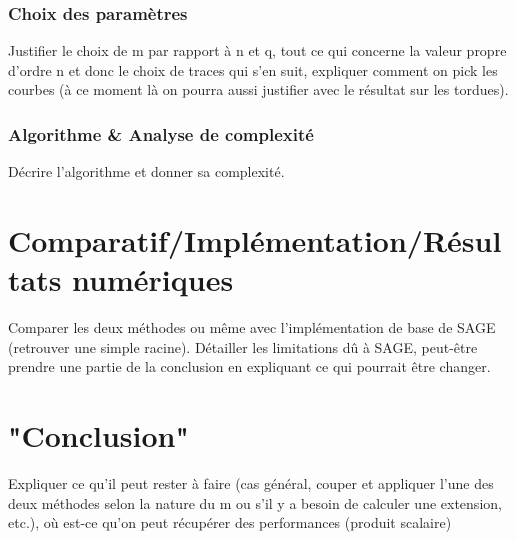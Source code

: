 \documentclass[a4paper]{article} %
\numberwithin{equation}{section}
\begin{document}
\subsubsection{Choix des paramètres}
Justifier le choix de m par rapport à n et q, tout ce qui concerne la valeur 
propre d'ordre n et donc le choix de traces qui s'en suit, expliquer comment on
pick les courbes (à ce moment là on pourra aussi justifier avec le résultat 
sur les tordues).
\subsubsection{Algorithme \& Analyse de complexité}
Décrire l'algorithme et donner sa complexité.

\section{Comparatif/Implémentation/Résultats numériques}
Comparer les deux méthodes ou même avec l'implémentation de base de SAGE 
(retrouver une simple racine). Détailler les limitations dû à SAGE, peut-être
prendre une partie de la conclusion en expliquant ce qui pourrait être changer.

\section{"Conclusion"}
Expliquer ce qu'il peut rester à faire (cas général, couper et appliquer 
l'une des deux méthodes selon la nature du m ou s'il y a besoin de calculer 
une extension, etc.), où est-ce qu'on peut récupérer des performances 
(produit scalaire)
\end{document}
